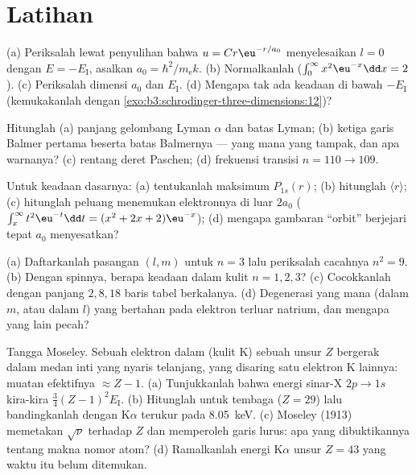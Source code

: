 \section{Latihan}

\begin{exercise}[$\star$]\label{exo:b3:hydrogen-atom:1}
(a) Periksalah lewat penyulihan bahwa $u = Cr\eu^{-r/a_0}$ menyelesaikan
 $l = 0$ dengan $E = -E_{\text{I}}$, asalkan $a_0 =
\hbar^2/m_{\text{e}}k$. (b) Normalkanlah ($\int_0^\infty
x^2\eu^{-x}\dd x = 2$). (c) Periksalah dimensi $a_0$ dan
$E_{\text{I}}$. (d) Mengapa tak ada keadaan di bawah $-E_{\text{I}}$
(kemukakanlah dengan \cref{exo:b3:schrodinger-three-dimensions:12})?
\end{exercise}

\begin{exercise}[$\star$]\label{exo:b3:hydrogen-atom:2}
Hitunglah (a) panjang gelombang Lyman $\alpha$ dan batas Lyman; (b)
ketiga garis Balmer pertama beserta batas Balmernya --- yang mana yang
tampak, dan apa warnanya? (c) rentang deret Paschen; (d) frekuensi
transisi $n = 110 \to 109$.
\end{exercise}

\begin{exercise}[$\star$]\label{exo:b3:hydrogen-atom:3}
Untuk keadaan dasarnya: (a) tentukanlah maksimum $P_{1s}(r)$; (b)
hitunglah $\langle r\rangle$; (c) hitunglah peluang menemukan
elektronnya di luar $2a_0$ ($\int_x^\infty t^2\eu^{-t}\dd t = (x^2 +
2x + 2)\eu^{-x}$); (d) mengapa gambaran ``orbit'' berjejari tepat
$a_0$ menyesatkan?
\end{exercise}

\begin{exercise}[$\star$]\label{exo:b3:hydrogen-atom:4}
(a) Daftarkanlah pasangan $(l, m)$ untuk $n = 3$ lalu periksalah cacahnya $n^2 =
9$. (b) Dengan spinnya, berapa keadaan dalam kulit
$n = 1, 2, 3$? (c) Cocokkanlah dengan panjang $2, 8, 18$ baris tabel
berkalanya. (d) Degenerasi yang mana (dalam $m$, atau dalam $l$) yang
bertahan pada elektron terluar natrium, dan mengapa yang lain pecah?
\end{exercise}

\begin{exercise}[$\star\star$]\label{exo:b3:hydrogen-atom:5}
Tangga Moseley. Sebuah elektron dalam (kulit K) sebuah unsur $Z$
bergerak dalam medan inti yang nyaris telanjang, yang disaring satu
elektron K lainnya: muatan efektifnya $\approx Z - 1$. (a) Tunjukkanlah
bahwa energi sinar-X $2p \to 1s$ kira-kira $\tfrac34(Z-1)^2E_{\text{I}}$.
(b) Hitunglah untuk tembaga ($Z = 29$) lalu bandingkanlah dengan
K$\alpha$ terukur pada \qty{8.05}{keV}. (c) Moseley (1913) memetakan
$\sqrt{\nu}$ terhadap $Z$ dan memperoleh garis lurus: apa yang
dibuktikannya tentang makna nomor atom? (d) Ramalkanlah energi
K$\alpha$ unsur $Z = 43$ yang waktu itu belum ditemukan.
\end{exercise}

